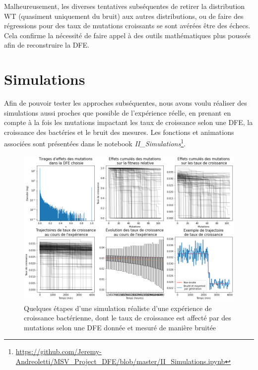 \documentclass[12pt]{article}
\begin{document}
Malheureusement, les diverses tentatives subséquentes de retirer la distribution WT (quasiment uniquement du bruit) aux autres distributions, ou de faire des régressions pour des taux de mutations croissants se sont avérées être des échecs. Cela confirme la nécessité de faire appel à des outils mathématiques plus poussés afin de reconstruire la DFE.

\FloatBarrier
\section{Simulations\label{s:sim}}

Afin de pouvoir tester les approches subséquentes, nous avons voulu réaliser des simulations aussi proches que possible de l'expérience réelle, en prenant en compte à la fois les mutations impactant les taux de croissance selon une DFE, la croissance des bactéries et le bruit des mesures. Les fonctions et animations associées sont présentées dans le notebook \emph{II\_Simulations}\footnote{\url{https://github.com/Jeremy-Andreoletti/MSV_Project_DFE/blob/master/II_Simulations.ipynb}}.

\begin{figure}[h]
  \begin{center}
    \vspace{3mm}
    \includegraphics[scale=0.5]{../Img/Simulations.png}
  \end{center} 
  \caption{\label{fig:simulations}Quelques étapes d'une simulation réaliste d'une expérience de croissance bactérienne, dont le taux de croissance est affecté par des mutations selon une DFE donnée et mesuré de manière bruitée}
\end{figure}
\end{document}
